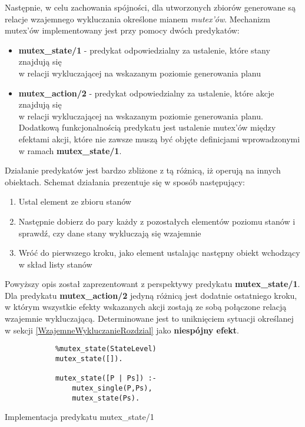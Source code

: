     
    Następnie, w celu zachowania spójności, dla utworzonych zbiorów 
    generowane są relacje wzajemnego wykluczania określone mianem \textit{mutex'ów}. Mechanizm mutex'ów implementowany jest przy pomocy dwóch predykatów:
    \begin{itemize}
        \item \textbf{mutex\_state/1} - predykat odpowiedzialny za ustalenie, które stany znajdują się \\
        w relacji wykluczającej na wskazanym 
        poziomie generowania planu
        \item \textbf{mutex\_action/2} - predykat odpowiedzialny za ustalenie, które akcje znajdują się \\
        w relacji wykluczającej na wskazanym
        poziomie generowania planu. Dodatkową funkcjonalnością predykatu jest ustalenie mutex'ów między efektami akcji, które 
        nie zawsze muszą być objęte definicjami wprowadzonymi w ramach \textbf{mutex\_state/1}.
    \end{itemize}

    Działanie predykatów jest bardzo zbliżone z tą różnicą, iż operują na innych obiektach. Schemat działania prezentuje się w sposób następujący:
    \begin{enumerate}
        \item Ustal element ze zbioru stanów
        \item Następnie dobierz do pary każdy z pozostałych elementów poziomu stanów i sprawdź, czy dane stany wykluczają się wzajemnie
        \item Wróć do pierwszego kroku, jako element ustalając następny obiekt wchodzący w skład listy stanów
    \end{enumerate}

    Powyższy opis został zaprezentowant z perspektywy predykatu \textbf{mutex\_state/1}. Dla predykatu \textbf{mutex\_action/2} jedyną różnicą jest 
    dodatnie ostatniego kroku, w którym wszystkie efekty wskazanych akcji zostają ze sobą połączone relacją wzajemnie wykluczającą. Determinowane 
    jest to uniknięciem sytuacji określanej w sekcji \ref{WzajemneWykluczanieRozdzial} jako \textbf{niespójny efekt}.

    \begin{listing}[H]
        \begin{verbatim}
            %mutex_state(StateLevel)
            mutex_state([]).

            mutex_state([P | Ps]) :-
                mutex_single(P,Ps),
                mutex_state(Ps).
        \end{verbatim}
    \caption{Implementacja predykatu mutex\_state/1}
    \end{listing}

